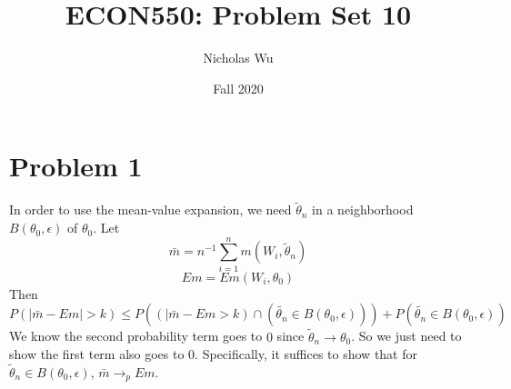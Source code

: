 \documentclass[10pt,letter]{article}
\begin{document}


\title{ECON550: Problem Set 10}

\author{Nicholas Wu}

\date{Fall 2020}

\maketitle
\section*{Problem 1}
In order to use the mean-value expansion, we need $\tilde{\theta}_n$ in a neighborhood $B(\theta_0, \epsilon)$ of $\theta_0$. Let
\[ \bar{m} = n^{-1}\sum_{i=1}^n m(W_i, \tilde{\theta}_n) \]
\[ Em = Em(W_i, \theta_0) \]
Then $P(|\bar{m} - Em| > k) \le P((|\bar{m} - Em > k)\cap(\tilde{\theta_n} \in B(\theta_0, \epsilon))) + P(\tilde{\theta_n} \in B(\theta_0, \epsilon))$
We know the second probability term goes to $0$ since $\tilde{\theta}_n \to \theta_0$. So we just need to show the first term also goes to 0. Specifically, it suffices to show that for $\tilde{\theta}_n \in B(\theta_0, \epsilon)$, $\bar{m} \to_p Em$.
\end{document}
